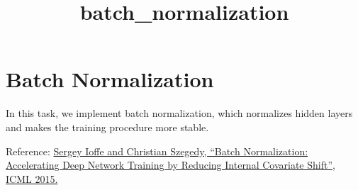 \documentclass[11pt]{article}
\title{batch\_normalization}
\begin{document}
    
    
    \maketitle
    
    

    
    \hypertarget{batch-normalization}{%
\section{Batch Normalization}\label{batch-normalization}}

In this task, we implement batch normalization, which normalizes hidden
layers and makes the training procedure more stable.

Reference: \href{https://arxiv.org/abs/1502.03167}{Sergey Ioffe and
Christian Szegedy, ``Batch Normalization: Accelerating Deep Network
Training by Reducing Internal Covariate Shift'', ICML 2015.}
\end{document}
